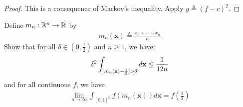 \documentclass{report}
\begin{document}
\begin{proof}
This is a consequence of Markov's inequality. Apply $g \triangleq (f-c)^2$. 
\end{proof}
\begin{question}{}{}
Define $m_n:\mathbb{R}^n \rightarrow \mathbb{R}$ by 
\begin{align*}
m_n(\textbf{x})\triangleq \frac{x_1+ \cdots + x_n}{n}
\end{align*}
Show that for all $\delta \in (0,\frac{1}{2})$ and $n\geq 1$, we have: 
\begin{align*}
\delta^2 \int_{\left|m_n(\textbf{x})-\frac{1}{2}\right| > \delta} d \textbf{x}  \leq \frac{1}{12n}
\end{align*}
and for all continuous $f$, we have 
\begin{align*}
\lim_{n\to \infty} \int_{[0,1]^n} f(m_n(\textbf{x}))d\textbf{x} = f\left(\frac{1}{2}\right)
\end{align*}
\end{question}
\end{document}
